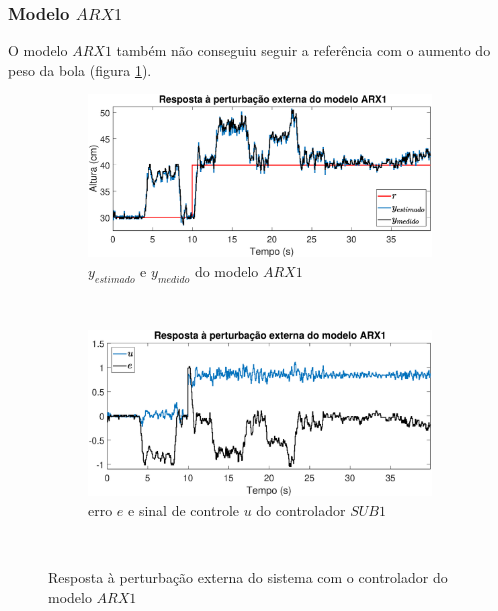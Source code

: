 \subsubsection{Modelo $ARX1$}
O modelo $ARX1$ também não conseguiu seguir a referência com o aumento do peso da bola (figura \ref{fig:pextrarx1y}).
\begin{figure}[htb]
	\centering
	\begin{subfigure}[t]{0.48\textwidth}
		\includegraphics[width=1\linewidth]{pextrarx1y}
		\caption[$y_{estimado}$ e $y_{medido}$ do modelo $ARX1$]{$y_{estimado}$ e $y_{medido}$ do modelo $ARX1$}
		\label{fig:pextrarx1y}
	\end{subfigure}
	~ %
	\begin{subfigure}[t]{0.48\textwidth}
		\includegraphics[width=1\linewidth]{pextrarx1e}
		\caption[erro $e$ e sinal de controle $u$ do controlador $SUB1$]{erro $e$ e sinal de controle $u$ do controlador $SUB1$}
		\label{fig:pextrarx1e}
	\end{subfigure}
	~ %
	
	\caption{Resposta à perturbação externa do sistema com o controlador do modelo $ARX1$}\label{fig:pextrarx1}
\end{figure}

